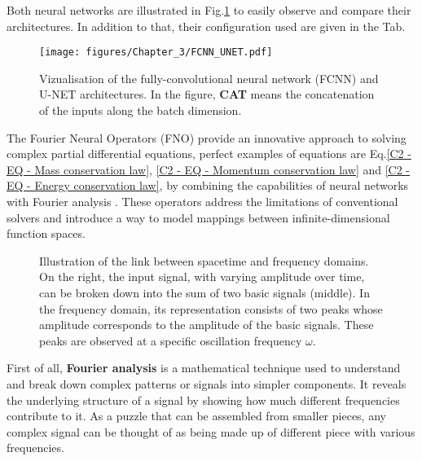 Both neural networks are illustrated in Fig.\ref{C3 - FIG - Vizualisation FCNN and UNET} to easily observe and compare their architectures. In addition to that, their configuration used are given in the Tab.

\newpage

\begin{figure}[H]
	\vspace{-2em}
    \centering
    \texttt{[image: figures/Chapter\_3/FCNN\_UNET.pdf]}
    \caption{Vizualisation of the fully-convolutional neural network (FCNN) and U-NET architectures. In the figure, \textbf{CAT} means the concatenation of the inputs along the batch dimension.}
    \label{C3 - FIG - Vizualisation FCNN and UNET}
\end{figure}

\newpage


The Fourier Neural Operators (FNO) provide an innovative approach to solving complex partial differential equations, perfect examples of equations are Eq.\ref{C2 - EQ - Mass conservation law}, \ref{C2 - EQ - Momentum conservation law} and \ref{C2 - EQ - Energy conservation law}, by combining the capabilities of neural networks with Fourier analysis \cite{FNO}. These operators address the limitations of conventional solvers and introduce a way to model mappings between infinite-dimensional function spaces.\\

\begin{wrapfigure}[25]{r}{.52\linewidth}
	\vspace{-1em}
    \centering
    \resizebox{\linewidth}{0.75\linewidth}{}
    \caption{Illustration of the link between spacetime and frequency domains. On the right, the input signal, with varying amplitude over time, can be broken down into the sum of two basic signals (middle). In the frequency domain, its representation consists of two peaks whose amplitude corresponds to the amplitude of the basic signals. These peaks are observed at a specific oscillation frequency $\omega$.}
    \label{C3 - FIG - Fourier Analysis}
\end{wrapfigure}

First of all, \textbf{Fourier analysis} is a mathematical technique used to understand and break down complex patterns or signals into simpler components. It reveals the underlying structure of a signal by showing how much different frequencies contribute to it.  As a puzzle that can be assembled from smaller pieces, any complex signal can be thought of as being made up of different piece with various frequencies.\\

